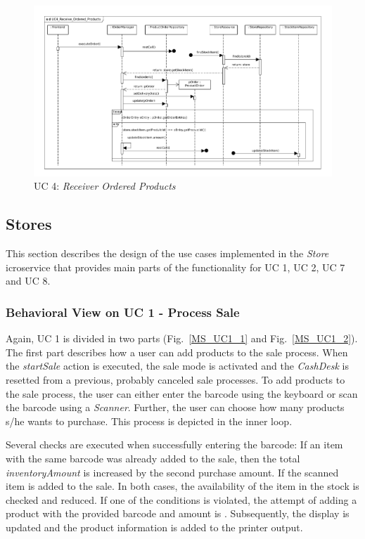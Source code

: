 			\begin{figure}[!h]
				\centering
				\includegraphics[width = 1\textwidth]{img/UC4_Receive_Ordered_Products.pdf}
				\caption{UC 4: \textit{Receiver Ordered Products} }
				\label{MS_UC4}
			\end{figure}
			
		\FloatBarrier
			
		\subsection{Stores}
			This section describes the design of the use cases implemented in the \textit{Store} icroservice that provides main parts of the functionality for UC 1, UC 2, UC 7 and UC 8.

		\subsubsection*{Behavioral View on UC 1 - Process Sale} 
		Again, UC 1 is divided in two parts (Fig.~\ref{MS_UC1_1} and Fig.~\ref{MS_UC1_2}).
		The first part describes how a user can add products to the sale process. When the \textit{startSale} action is executed, the sale mode is activated and the \textit{CashDesk} is resetted from a previous, probably canceled sale processes. To add products to the sale process, the user can either enter the barcode  using the keyboard or scan the barcode using a \textit{Scanner}. Further, the user can choose how many products s/he wants to purchase. This process is depicted in the inner loop. 
		
		Several checks are executed when successfully entering the barcode: 
		If an item with the same barcode was already added to the sale, then the total \textit{inventoryAmount} is increased by the second purchase amount. 
		If the scanned item is added to the sale.
		In both cases, the availability of the item in the stock is checked and reduced. 
		If one of the conditions is violated, the attempt of adding a product with the provided barcode and amount is . 
		Subsequently, the display is updated and the product information is added to the printer output.
		
